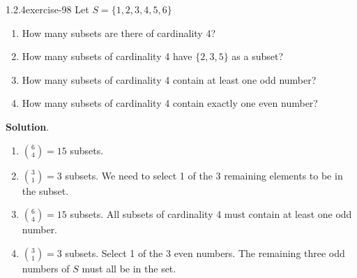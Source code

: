 \documentclass[twoside,11pt,]{book}
\numberwithin{equation}{chapter}
\begin{document}
\begin{divisionsolution}{1.2.4}{}{exercise-98}%
\hypertarget{p-1566}{}%
Let \(S = \{1, 2, 3, 4, 5, 6\}\)\leavevmode%
\begin{enumerate}[label=(\alph*)]
\item\hypertarget{li-1106}{}\hypertarget{p-1567}{}%
How many subsets are there of cardinality 4?%
\item\hypertarget{li-1107}{}\hypertarget{p-1568}{}%
How many subsets of cardinality 4 have \(\{2,3,5\}\) as a subset?%
\item\hypertarget{li-1108}{}\hypertarget{p-1570}{}%
How many subsets of cardinality 4 contain at least one odd number?%
\item\hypertarget{li-1109}{}\hypertarget{p-1572}{}%
How many subsets of cardinality 4 contain exactly one even number?%
\end{enumerate}
%
\par\smallskip%
\noindent\textbf{Solution}.\quad%
\hypertarget{p-1574}{}%
\leavevmode%
\begin{enumerate}[label=(\alph*)]
\item\hypertarget{li-1110}{}\hypertarget{p-1575}{}%
\({6\choose 4} = 15\) subsets.%
\item\hypertarget{li-1111}{}\hypertarget{p-1576}{}%
\({3 \choose 1} = 3\) subsets. We need to select 1 of the 3 remaining elements to be in the subset.%
\item\hypertarget{li-1112}{}\hypertarget{p-1577}{}%
\({6 \choose 4} = 15\) subsets. All subsets of cardinality 4 must contain at least one odd number.%
\item\hypertarget{li-1113}{}\hypertarget{p-1578}{}%
\({3 \choose 1} = 3\) subsets. Select 1 of the 3 even numbers. The remaining three odd numbers of \(S\) must all be in the set.%
\end{enumerate}
%
\end{divisionsolution}%
\end{document}
